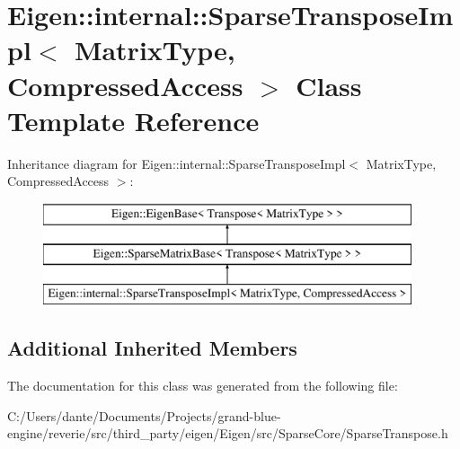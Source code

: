 \hypertarget{class_eigen_1_1internal_1_1_sparse_transpose_impl}{}\section{Eigen\+::internal\+::Sparse\+Transpose\+Impl$<$ Matrix\+Type, Compressed\+Access $>$ Class Template Reference}
\label{class_eigen_1_1internal_1_1_sparse_transpose_impl}
Inheritance diagram for Eigen\+::internal\+::Sparse\+Transpose\+Impl$<$ Matrix\+Type, Compressed\+Access $>$\+:\begin{figure}[H]
\begin{center}
\leavevmode
\includegraphics[height=3.000000cm]{class_eigen_1_1internal_1_1_sparse_transpose_impl}
\end{center}
\end{figure}
\subsection*{Additional Inherited Members}


The documentation for this class was generated from the following file\+:\begin{DoxyCompactItemize}
\item 
C\+:/\+Users/dante/\+Documents/\+Projects/grand-\/blue-\/engine/reverie/src/third\+\_\+party/eigen/\+Eigen/src/\+Sparse\+Core/Sparse\+Transpose.\+h\end{DoxyCompactItemize}
